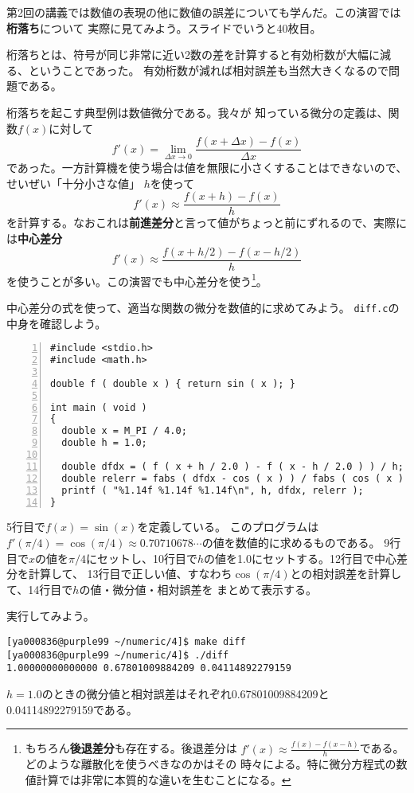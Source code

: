 \documentclass[a4paper]{jsarticle}
\begin{document}
第2回の講義では数値の表現の他に数値の誤差についても学んだ。この演習では\textbf{桁落ち}について
実際に見てみよう。スライドでいうと40枚目。

桁落ちとは、符号が同じ非常に近い2数の差を計算すると有効桁数が大幅に減る、ということであった。
有効桁数が減れば相対誤差も当然大きくなるので問題である。

桁落ちを起こす典型例は数値微分である。我々が
知っている微分の定義は、関数$f(x)$に対して
\begin{equation*}
f'(x) = \lim_{\Delta x \rightarrow 0} \frac{f(x+\Delta x) - f(x)}{\Delta x}
\end{equation*}
であった。一方計算機を使う場合は値を無限に小さくすることはできないので、せいぜい「十分小さな値」
$h$を使って
\begin{equation*}
f'(x) \approx \frac{f(x+h) - f(x)}{h}
\end{equation*}
を計算する。なおこれは\textbf{前進差分}と言って値がちょっと前にずれるので、実際には\textbf{中心差分}
\begin{equation*}
f'(x) \approx \frac{f(x+h/2) - f(x-h/2)}{h}
\end{equation*}
を使うことが多い。この演習でも中心差分を使う\footnote{もちろん\textbf{後退差分}も存在する。後退差分は
$\displaystyle f'(x) \approx \frac{f(x) - f(x-h)}{h}$である。どのような離散化を使うべきなのかはその
時々による。特に微分方程式の数値計算では非常に本質的な違いを生むことになる。}。

中心差分の式を使って、適当な関数の微分を数値的に求めてみよう。
\texttt{diff.c}の中身を確認しよう。
\begin{lstlisting}[caption={\texttt{diff.c}},numbers=left]
#include <stdio.h>
#include <math.h>

double f ( double x ) { return sin ( x ); }

int main ( void )
{
  double x = M_PI / 4.0;
  double h = 1.0;

  double dfdx = ( f ( x + h / 2.0 ) - f ( x - h / 2.0 ) ) / h;
  double relerr = fabs ( dfdx - cos ( x ) ) / fabs ( cos ( x ) );
  printf ( "%1.14f %1.14f %1.14f\n", h, dfdx, relerr );
}
\end{lstlisting}
5行目で$f(x) = \sin (x)$を定義している。
このプログラムは$f'(\pi/4) = \cos(\pi/4) \approx 0.70710678\cdots$の値を数値的に求めるものである。
9行目で$x$の値を$\pi/4$にセットし、10行目で$h$の値を1.0にセットする。12行目で中心差分を計算して、
13行目で正しい値、すなわち$\cos(\pi/4)$との相対誤差を計算して、14行目で$h$の値・微分値・相対誤差を
まとめて表示する。

実行してみよう。
\begin{lstlisting}
[ya000836@purple99 ~/numeric/4]$ make diff
[ya000836@purple99 ~/numeric/4]$ ./diff
1.00000000000000 0.67801009884209 0.04114892279159
\end{lstlisting}
$h=1.0$のときの微分値と相対誤差はそれぞれ0.67801009884209と0.04114892279159である。
\end{document}
